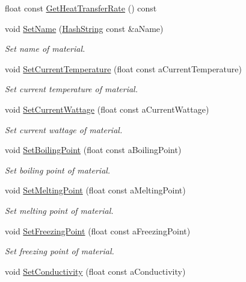 \begin{DoxyCompactItemize}
\item 
float const \hyperlink{classChemistryMaterial_ad038c5df67e4d1d67613717428c02d7d}{Get\+Heat\+Transfer\+Rate} () const 
\item 
void \hyperlink{classChemistryMaterial_a86aa557fdf29fe24929d076acc2f3dd9}{Set\+Name} (\hyperlink{classHashString}{Hash\+String} const \&a\+Name)
\begin{DoxyCompactList}\small\item\em Set name of material. \end{DoxyCompactList}\item 
void \hyperlink{classChemistryMaterial_a40d7fd30a4f5bb266da5d29c47e1d45d}{Set\+Current\+Temperature} (float const a\+Current\+Temperature)
\begin{DoxyCompactList}\small\item\em Set current temperature of material. \end{DoxyCompactList}\item 
void \hyperlink{classChemistryMaterial_a543a5d6aebe1a7d28ca83d347490746d}{Set\+Current\+Wattage} (float const a\+Current\+Wattage)
\begin{DoxyCompactList}\small\item\em Set current wattage of material. \end{DoxyCompactList}\item 
void \hyperlink{classChemistryMaterial_a379d99c5367a729057ab5c1ba059db0f}{Set\+Boiling\+Point} (float const a\+Boiling\+Point)
\begin{DoxyCompactList}\small\item\em Set boiling point of material. \end{DoxyCompactList}\item 
void \hyperlink{classChemistryMaterial_a5d0492b780b08a2c2d626157aeeafa19}{Set\+Melting\+Point} (float const a\+Melting\+Point)
\begin{DoxyCompactList}\small\item\em Set melting point of material. \end{DoxyCompactList}\item 
void \hyperlink{classChemistryMaterial_a9f1c3a74825ed15824b39c492be4d092}{Set\+Freezing\+Point} (float const a\+Freezing\+Point)
\begin{DoxyCompactList}\small\item\em Set freezing point of material. \end{DoxyCompactList}\item 
void \hyperlink{classChemistryMaterial_a1fc73bce0ce392c665e60860944c1ba1}{Set\+Conductivity} (float const a\+Conductivity)

\end{DoxyCompactItemize}
